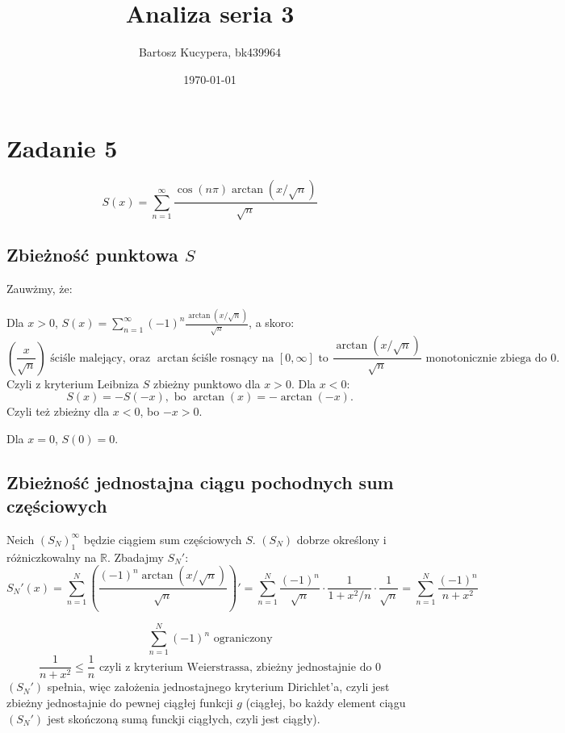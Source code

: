 \documentclass{article}
\title{Analiza seria 3}
\author{Bartosz Kucypera, bk439964}
\date{\today}
\begin{document}
\maketitle

\section*{Zadanie 5}
$$S(x) = \displaystyle \sum_{n=1}^{\infty}\frac{\cos(n\pi)\arctan(x/ \sqrt{n})}{\sqrt{n}} $$

\subsection*{Zbieżność punktowa $S$}
Zauwżmy, że: \newline 

Dla $x > 0$, $S(x) = \sum_{n=1}^{\infty} (-1)^n \frac{\arctan(x /\sqrt{n})}{\sqrt{n}}$, a skoro:
$$\left( \frac{x}{\sqrt{n} }\right) \mbox{ ściśle malejący, oraz } \arctan  \mbox{ściśle rosnący na } [0,\infty] \mbox{ to } \frac{\arctan(x /\sqrt{n})}{\sqrt{n}} \mbox{ monotonicznie zbiega do } 0.$$
Czyli z kryterium Leibniza $S$ zbieżny punktowo dla $x > 0$. \newline
Dla $x < 0$:
$$S(x) = -S(-x), \mbox{ bo } \arctan(x) = -\arctan(-x). $$
Czyli też zbieżny dla $x < 0$, bo $-x > 0$.

Dla $x = 0$, $S(0) = 0$.

\subsection*{Zbieżność jednostajna ciągu pochodnych sum częściowych}

Neich $(S_N)_{1}^{\infty}$ będzie ciągiem sum częściowych $S$.
$(S_N)$ dobrze określony i różniczkowalny na $\mathbb{R}$. \newline
Zbadajmy $S_N'$:
$$ S_N'(x) = \sum_{n=1}^{N} \left( \frac{(-1)^n \arctan(x/ \sqrt{n})}{\sqrt{n}} \right)' =
\sum_{n=1}^{N} \frac{(-1)^n}{\sqrt{n}} \cdot \frac{1}{1 + x^2 /n} \cdot \frac{1}{\sqrt{n}} =
\sum_{n=1}^{N} \frac{(-1)^n}{n+x^2}$$

$$ \sum_{n=1}^{N}(-1)^n \mbox{ ograniczony} $$
$$\frac{1}{n+x^2} \le \frac{1}{n} \mbox{ czyli z kryterium Weierstrassa, zbieżny jednostajnie do 0}$$
$(S_N')$ spełnia, więc założenia jednostajnego kryterium Dirichlet'a, czyli jest zbieżny jednostajnie do pewnej ciągłej funkcji $g$ (ciągłej, bo każdy element ciągu $(S_N')$ jest skończoną sumą funckji ciągłych, czyli jest ciągły). \newline \newline
\end{document}
